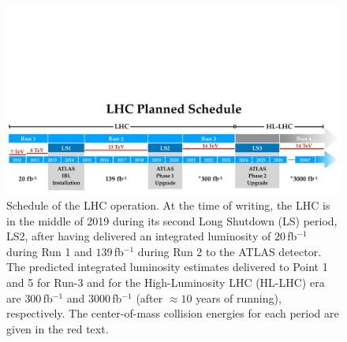 \begin{figure}[!htb]
    \begin{center}
        \includegraphics[width=\textwidth]{figures/chapter2/lhc_schedulePDF}
        \caption{
            Schedule of the LHC operation.
            At the time of writing, the LHC is in the middle of 2019 during its second
            Long Shutdown (LS) period, LS2, after having delivered an integrated luminosity of $20\,$fb$^{-1}$
            during Run 1 and $139\,$fb$^{-1}$ during Run 2 to the ATLAS detector.
            The predicted integrated luminosity estimates delivered to Point 1 and 5 for Run-3 and for the High-Luminosity LHC (HL-LHC)
            era are $300\,$fb$^{-1}$ and $3000\,$fb$^{-1}$ (after $\approx 10$ years of running), respectively.
            The center-of-mass collision energies for each period are given in the red text.
        }
        \label{fig:lhc_schedule}
    \end{center}
\end{figure}
